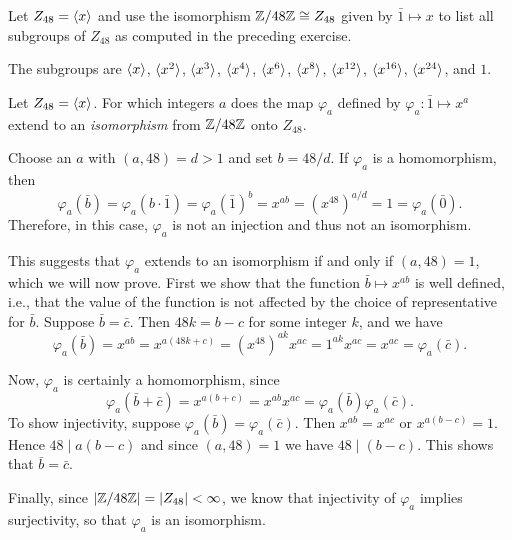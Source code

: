  Let $Z_{48} = \langle{x}\rangle$ and use the isomorphism
$\mathbb{Z}/48\mathbb{Z}\cong Z_{48}$ given by $\bar1\mapsto x$ to list all subgroups
of $Z_{48}$ as computed in the preceding exercise.
\begin{solution}
  The subgroups are $\langle{x}\rangle$, $\langle{x^2}\rangle$, $\langle{x^3}\rangle$, $\langle{x^4}\rangle$,
  $\langle{x^6}\rangle$, $\langle{x^8}\rangle$, $\langle{x^{12}}\rangle$, $\langle{x^{16}}\rangle$,
  $\langle{x^{24}}\rangle$, and $1$.
\end{solution}

 Let $Z_{48} = \langle{x}\rangle$. For which integers $a$ does the map
$\varphi_a$ defined by $\varphi_a\colon\bar1\mapsto x^a$ extend to an
{\em isomorphism} from $\mathbb{Z}/48\mathbb{Z}$ onto $Z_{48}$.
\begin{solution}
  Choose an $a$ with $(a,48) = d > 1$ and set $b = 48 / d$. If
  $\varphi_a$ is a homomorphism, then
  \begin{equation*}
    \varphi_a(\bar{b}) = \varphi_a(b\cdot\bar1)
    = \varphi_a(\bar1)^b = x^{ab} = (x^{48})^{a/d} = 1 = \varphi_a(\bar0).
  \end{equation*}
  Therefore, in this case, $\varphi_a$ is not an injection and thus
  not an isomorphism.

  This suggests that $\varphi_a$ extends to an isomorphism if and only
  if $(a,48) = 1$, which we will now prove. First we show that the
  function $\bar{b}\mapsto x^{ab}$ is well defined, i.e., that the
  value of the function is not affected by the choice of
  representative for $\bar{b}$. Suppose $\bar{b} = \bar{c}$. Then
  $48k = b - c$ for some integer $k$, and we have
  \begin{equation*}
    \varphi_a(\bar{b}) = x^{ab} = x^{a(48k + c)} = (x^{48})^{ak}x^{ac}
    = 1^{ak}x^{ac} = x^{ac} = \varphi_a(\bar{c}).
  \end{equation*}

  Now, $\varphi_a$ is certainly a homomorphism, since
  \begin{equation*}
    \varphi_a(\bar{b} + \bar{c}) = x^{a(b + c)} = x^{ab}x^{ac} =
    \varphi_a(\bar{b})\varphi_a(\bar{c}).
  \end{equation*}
  To show injectivity, suppose
  $\varphi_a(\bar{b}) = \varphi_a(\bar{c})$. Then $x^{ab} = x^{ac}$ or
  $x^{a(b - c)} = 1$. Hence $48\mid a(b - c)$ and since $(a,48) = 1$
  we have $48\mid(b - c)$. This shows that $\bar{b} = \bar{c}$.

  Finally, since $\lvert{\mathbb{Z}/48\mathbb{Z}}\rvert = \lvert{Z_{48}}\rvert < \infty$, we know that
  injectivity of $\varphi_a$ implies surjectivity, so that $\varphi_a$
  is an isomorphism.
\end{solution}

